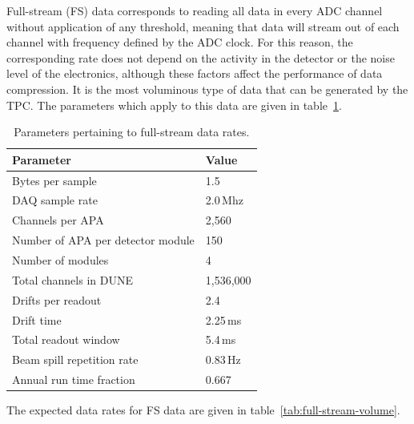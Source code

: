 Full-stream (FS) data corresponds to reading all data in every ADC channel without
application of any threshold, meaning that data will stream out of each channel
with frequency defined by the ADC clock. For this reason,
the corresponding rate does not depend on the 
activity in the detector or the noise
level of the electronics, although these factors affect the performance of data compression.
It is the most voluminous type of data
that can be generated by the TPC. The parameters which apply to this data are given in
table~\ref{tab:full-stream-parameters}.

\begin{table}[ht!]
	\centering
	\begin{tabular}{| p{3in} | p{1.1in} |}
		\hline

	\textbf{Parameter} & \textbf{Value} \\ \hline
	
	Bytes per sample & 1.5 \\ \hline
	
	DAQ sample rate & 2.0\,Mhz \\ \hline
	
	Channels per APA & 2,560 \\ \hline
	
	Number of APA per detector module & 150 \\ \hline
	
	Number of modules & 4 \\ \hline
	
	Total channels in DUNE & 1,536,000 \\ \hline \hline
	
	Drifts per readout & 2.4 \\ \hline
	
	Drift time & 2.25\,ms \\ \hline

	Total readout window & 5.4\,ms \\ \hline \hline
	
	Beam spill repetition rate & 0.83\,Hz \\ \hline
	
	Annual run time fraction & 0.667 \\ \hline
	\end{tabular}
	\caption{Parameters pertaining to full-stream data rates.}
	\label{tab:full-stream-parameters}
\end{table}
The expected data rates for FS data are given
in table~\ref{tab:full-stream-volume}.
